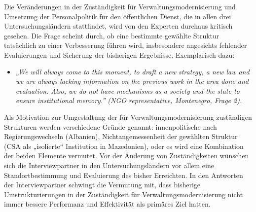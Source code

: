 Die Veränderungen in der Zuständigkeit für Verwaltungsmodernisierung und Umsetzung der Personalpolitik für den öffentlichen Dienst, die in allen drei Untersuchungsländern stattfindet, wird von den Experten durchaus kritisch gesehen. Die Frage scheint durch, ob eine bestimmte gewählte Struktur tatsächlich zu einer Verbesserung führen wird, insbesondere angesichts fehlender Evaluierungen und Sicherung der bisherigen Ergebnisse. Exemplarisch dazu: 
\begin{itemize}[label={}]
\item \textit{„We will always come to this moment, to draft a new strategy, a new law and we are always lacking information on the previous work in the area done and evaluation. Also, we do not have mechanisms as a society and the state to ensure institutional memory.” (NGO representative, Montenegro, Frage 2).}
\end{itemize}
Als Motivation zur Umgestaltung der für Verwaltungsmodernisierung zuständigen Strukturen werden verschiedene Gründe genannt: innenpolitische nach Regierungswechseln (Albanien), Nichtangemessenheit der gewählten Struktur (CSA als „isolierte“ Institution in Mazedonien), oder es wird eine Kombination der beiden Elemente vermutet. Vor der Änderung von Zuständigkeiten  wünschen sich die Interviewpartner in den Untersuchungsländern vor allem eine Standortbestimmung und Evaluierung des bisher Erreichten. In den Antworten der Interviewpartner schwingt die Vermutung mit, dass bisherige Umstrukturierungen in der Zuständigkeit für Verwaltungsmodernisierung nicht immer bessere Performanz und Effektivität als primäres Ziel hatten.
